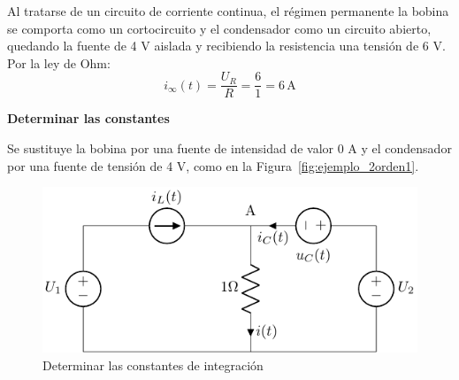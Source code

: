 \begin{example}
  Al tratarse de un circuito de corriente continua, el régimen
  permanente la bobina se comporta como un cortocircuito y el
  condensador como un circuito abierto, quedando la fuente de 4 V
  aislada y recibiendo la resistencia una tensión de 6 V. Por la ley
  de Ohm:
  \begin{equation*}
    i_\infty(t)=\dfrac{U_R}{R}=\dfrac{6}{1}=6\,\text{A}
  \end{equation*}
	    
  \textbf{Determinar las constantes}
	    
  Se sustituye la bobina por una fuente de intensidad de valor 0 A y
  el condensador por una fuente de tensión de 4 V, como en la
  Figura~\ref{fig:ejemplo_2orden1}.
  \begin{figure}[H]
    \centering
    \includegraphics[width=0.45\linewidth]{../figs/ejemplo_2orden2.pdf}
    \caption{Determinar las constantes de integración}
    \label{fig:ejemplo_2orden2}
  \end{figure}
	    

\end{example}
